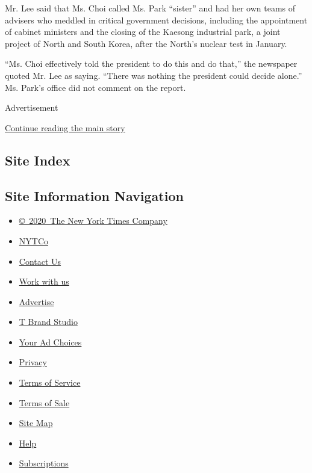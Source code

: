 Mr. Lee said that Ms. Choi called Ms. Park ``sister'' and had her own
teams of advisers who meddled in critical government decisions,
including the appointment of cabinet ministers and the closing of the
Kaesong industrial park, a joint project of North and South Korea, after
the North's nuclear test in January.

``Ms. Choi effectively told the president to do this and do that,'' the
newspaper quoted Mr. Lee as saying. ``There was nothing the president
could decide alone.'' Ms. Park's office did not comment on the report.

Advertisement

\protect\hyperlink{after-bottom}{Continue reading the main story}

\hypertarget{site-index}{%
\subsection{Site Index}\label{site-index}}

\hypertarget{site-information-navigation}{%
\subsection{Site Information
Navigation}\label{site-information-navigation}}

\begin{itemize}
\tightlist
\item
  \href{https://help.nytimes3xbfgragh.onion/hc/en-us/articles/115014792127-Copyright-notice}{©~2020~The
  New York Times Company}
\end{itemize}

\begin{itemize}
\tightlist
\item
  \href{https://www.nytco.com/}{NYTCo}
\item
  \href{https://help.nytimes3xbfgragh.onion/hc/en-us/articles/115015385887-Contact-Us}{Contact
  Us}
\item
  \href{https://www.nytco.com/careers/}{Work with us}
\item
  \href{https://nytmediakit.com/}{Advertise}
\item
  \href{http://www.tbrandstudio.com/}{T Brand Studio}
\item
  \href{https://www.nytimes3xbfgragh.onion/privacy/cookie-policy\#how-do-i-manage-trackers}{Your
  Ad Choices}
\item
  \href{https://www.nytimes3xbfgragh.onion/privacy}{Privacy}
\item
  \href{https://help.nytimes3xbfgragh.onion/hc/en-us/articles/115014893428-Terms-of-service}{Terms
  of Service}
\item
  \href{https://help.nytimes3xbfgragh.onion/hc/en-us/articles/115014893968-Terms-of-sale}{Terms
  of Sale}
\item
  \href{https://spiderbites.nytimes3xbfgragh.onion}{Site Map}
\item
  \href{https://help.nytimes3xbfgragh.onion/hc/en-us}{Help}
\item
  \href{https://www.nytimes3xbfgragh.onion/subscription?campaignId=37WXW}{Subscriptions}
\end{itemize}
